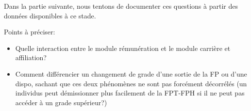\documentclass[11pt,a4paper]{article}
\begin{document}
Dans la partie suivante, nous tentons de documenter ces questions à partir des données disponibles à ce stade. 



\vspace{0.5cm}
Points à préciser: 
\begin{itemize}[leftmargin=1cm ,parsep=0cm,itemsep=0cm,topsep=0cm] 
\item Quelle interaction entre le module rémunération et le module carrière et affiliation?  
\item Comment différencier un changement de grade d'une sortie de la FP ou d'une dispo, sachant que ces deux phénomènes ne sont pas forcément décorrélés (un individus peut démissionner plus facilement de la FPT-FPH si il ne peut pas accéder à un grade supérieur?) 
\end{itemize}










\ifx\isEmbedded\undefined
\newpage
 

\end{document}
